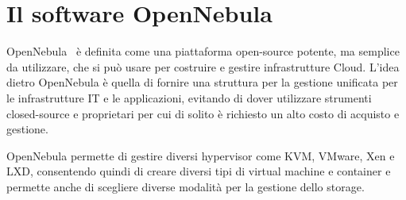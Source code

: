 \section{Il software OpenNebula}
OpenNebula~\cite{opennebula} è definita come una piattaforma open-source potente, ma semplice da utilizzare, che si può usare per costruire e gestire infrastrutture Cloud. L'idea dietro OpenNebula è quella di fornire una struttura per la gestione unificata per le infrastrutture IT e le applicazioni, evitando di dover utilizzare strumenti closed-source e proprietari per cui di solito è richiesto un alto costo di acquisto e gestione.\par
OpenNebula permette di gestire diversi hypervisor come KVM, VMware, Xen e LXD, consentendo quindi di creare diversi tipi di virtual machine e container e permette anche di scegliere diverse modalità per la gestione dello storage.
